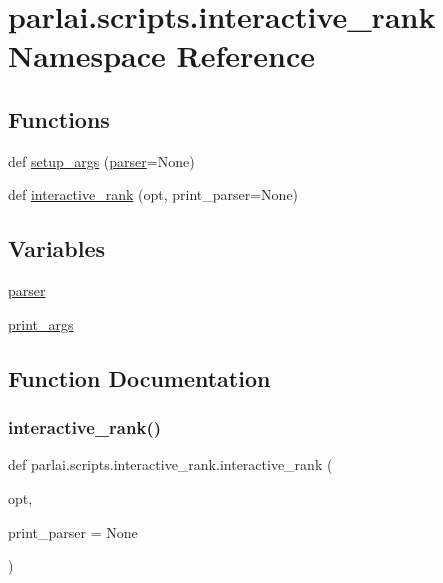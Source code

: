\hypertarget{namespaceparlai_1_1scripts_1_1interactive__rank}{}\section{parlai.\+scripts.\+interactive\+\_\+rank Namespace Reference}
\label{namespaceparlai_1_1scripts_1_1interactive__rank}
\subsection*{Functions}
\begin{DoxyCompactItemize}
\item 
def \hyperlink{namespaceparlai_1_1scripts_1_1interactive__rank_af87c6b5d3f8843e51461c9cfd75fd510}{setup\+\_\+args} (\hyperlink{namespaceparlai_1_1scripts_1_1interactive__rank_a69b6e90931629e4bb38cdd3ca8f6fd38}{parser}=None)
\item 
def \hyperlink{namespaceparlai_1_1scripts_1_1interactive__rank_a9997f1d0eba4a72a45a773ec05874af3}{interactive\+\_\+rank} (opt, print\+\_\+parser=None)
\end{DoxyCompactItemize}
\subsection*{Variables}
\begin{DoxyCompactItemize}
\item 
\hyperlink{namespaceparlai_1_1scripts_1_1interactive__rank_a69b6e90931629e4bb38cdd3ca8f6fd38}{parser}
\item 
\hyperlink{namespaceparlai_1_1scripts_1_1interactive__rank_a1c1bdd9d0f64903e7167d0f6d3f780ef}{print\+\_\+args}
\end{DoxyCompactItemize}


\subsection{Function Documentation}
\mbox{\label{namespaceparlai_1_1scripts_1_1interactive__rank_a9997f1d0eba4a72a45a773ec05874af3}} 
\subsubsection{\texorpdfstring{interactive\+\_\+rank()}{interactive\_rank()}}
{\footnotesize\ttfamily def parlai.\+scripts.\+interactive\+\_\+rank.\+interactive\+\_\+rank (\begin{DoxyParamCaption}\item[{}]{opt,  }\item[{}]{print\+\_\+parser = {\ttfamily None} }\end{DoxyParamCaption})}



